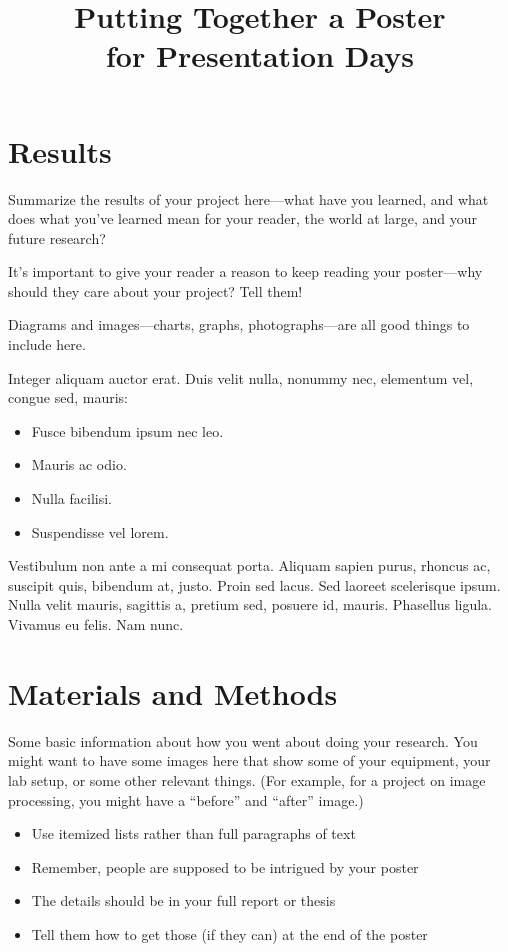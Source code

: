 \documentclass[clinic]{hmcposter}
\title{Putting Together a Poster\\for Presentation Days}
\begin{document}
\begin{poster}

\section{Results}

Summarize the results of your project here---what have you
learned, and what does what you've learned mean for your reader,
the world at large, and your future research?

It's important to give your reader a reason to keep reading your
poster---why should they care about your project?  Tell them!

Diagrams and images---charts, graphs, photographs---are all good
things to include here.

Integer aliquam auctor erat. Duis velit nulla, nonummy nec,
elementum vel, congue sed, mauris:

\begin{itemize}
\item Fusce bibendum ipsum nec leo. 
\item Mauris ac odio. 
\item Nulla facilisi. 
\item Suspendisse vel lorem.
\end{itemize}
Vestibulum non ante a mi consequat porta. Aliquam sapien
purus, rhoncus ac, suscipit quis, bibendum at, justo. Proin sed
lacus. Sed laoreet scelerisque ipsum. Nulla velit mauris, sagittis
a, pretium sed, posuere id, mauris. Phasellus ligula. Vivamus eu
felis. Nam nunc.


\section{Materials and Methods}%

Some basic information about how you went about doing your
research.  You might want to have some images here that show some of
your equipment, your lab setup, or some other relevant things.  (For
example, for a project on image processing, you might have a
``before'' and ``after'' image.)

\begin{itemize}
\item Use itemized lists rather than full paragraphs of text
\item Remember, people are supposed to be intrigued by your poster
\item The details should be in your full report or thesis
\item Tell them how to get those (if they can) at the end of the poster
\end{itemize}



\end{poster}
\end{document}
